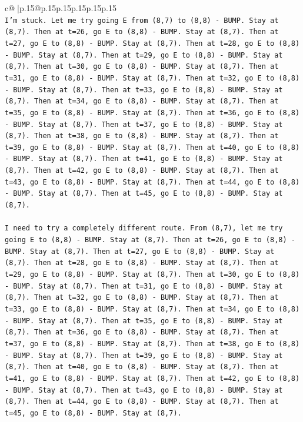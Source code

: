 \documentclass{article}
\begin{document}
{\begin{supertabular}{c@{$\;$}|p{.15\linewidth}@{}p{.15\linewidth}p{.15\linewidth}p{.15\linewidth}p{.15\linewidth}p{.15\linewidth}}
{{{\\ 
\texttt{I'm stuck. Let me try going E from (8,7) to (8,8) {-} BUMP. Stay at (8,7). Then at t=26, go E to (8,8) {-} BUMP. Stay at (8,7). Then at t=27, go E to (8,8) {-} BUMP. Stay at (8,7). Then at t=28, go E to (8,8) {-} BUMP. Stay at (8,7). Then at t=29, go E to (8,8) {-} BUMP. Stay at (8,7). Then at t=30, go E to (8,8) {-} BUMP. Stay at (8,7). Then at t=31, go E to (8,8) {-} BUMP. Stay at (8,7). Then at t=32, go E to (8,8) {-} BUMP. Stay at (8,7). Then at t=33, go E to (8,8) {-} BUMP. Stay at (8,7). Then at t=34, go E to (8,8) {-} BUMP. Stay at (8,7). Then at t=35, go E to (8,8) {-} BUMP. Stay at (8,7). Then at t=36, go E to (8,8) {-} BUMP. Stay at (8,7). Then at t=37, go E to (8,8) {-} BUMP. Stay at (8,7). Then at t=38, go E to (8,8) {-} BUMP. Stay at (8,7). Then at t=39, go E to (8,8) {-} BUMP. Stay at (8,7). Then at t=40, go E to (8,8) {-} BUMP. Stay at (8,7). Then at t=41, go E to (8,8) {-} BUMP. Stay at (8,7). Then at t=42, go E to (8,8) {-} BUMP. Stay at (8,7). Then at t=43, go E to (8,8) {-} BUMP. Stay at (8,7). Then at t=44, go E to (8,8) {-} BUMP. Stay at (8,7). Then at t=45, go E to (8,8) {-} BUMP. Stay at (8,7).} \\
\\ 
\texttt{I need to try a completely different route. From (8,7), let me try going E to (8,8) {-} BUMP. Stay at (8,7). Then at t=26, go E to (8,8) {-} BUMP. Stay at (8,7). Then at t=27, go E to (8,8) {-} BUMP. Stay at (8,7). Then at t=28, go E to (8,8) {-} BUMP. Stay at (8,7). Then at t=29, go E to (8,8) {-} BUMP. Stay at (8,7). Then at t=30, go E to (8,8) {-} BUMP. Stay at (8,7). Then at t=31, go E to (8,8) {-} BUMP. Stay at (8,7). Then at t=32, go E to (8,8) {-} BUMP. Stay at (8,7). Then at t=33, go E to (8,8) {-} BUMP. Stay at (8,7). Then at t=34, go E to (8,8) {-} BUMP. Stay at (8,7). Then at t=35, go E to (8,8) {-} BUMP. Stay at (8,7). Then at t=36, go E to (8,8) {-} BUMP. Stay at (8,7). Then at t=37, go E to (8,8) {-} BUMP. Stay at (8,7). Then at t=38, go E to (8,8) {-} BUMP. Stay at (8,7). Then at t=39, go E to (8,8) {-} BUMP. Stay at (8,7). Then at t=40, go E to (8,8) {-} BUMP. Stay at (8,7). Then at t=41, go E to (8,8) {-} BUMP. Stay at (8,7). Then at t=42, go E to (8,8) {-} BUMP. Stay at (8,7). Then at t=43, go E to (8,8) {-} BUMP. Stay at (8,7). Then at t=44, go E to (8,8) {-} BUMP. Stay at (8,7). Then at t=45, go E to (8,8) {-} BUMP. Stay at (8,7).} \\
\\ 
}}}
\end{supertabular}}
\end{document}
